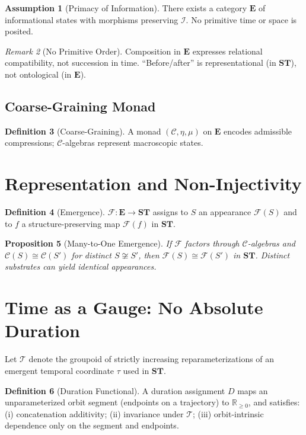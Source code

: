 \documentclass[11pt]{article}
\theoremstyle{definition}
\newtheorem{definition}{Definition}[section]
\newtheorem{assumption}[definition]{Assumption}
\theoremstyle{plain}
\newtheorem{proposition}[definition]{Proposition}
\theoremstyle{remark}
\newtheorem{remark}[definition]{Remark}
\newcommand{\Ecat}{\mathbf{E}}      %
\newcommand{\ST}{\mathbf{ST}}       %
\newcommand{\F}{\mathcal{F}}        %
\newcommand{\I}{\mathcal{I}}        %
\newcommand{\C}{\mathcal{C}}        %
\begin{document}
\begin{assumption}[Primacy of Information]
There exists a category $\Ecat$ of informational states with morphisms preserving $\I$. No primitive time or space is posited.
\end{assumption}

\begin{remark}[No Primitive Order]
Composition in $\Ecat$ expresses relational compatibility, not succession in time. ``Before/after'' is representational (in $\ST$), not ontological (in $\Ecat$).
\end{remark}

\subsection{Coarse-Graining Monad}
\begin{definition}[Coarse-Graining]
A monad $(\C,\eta,\mu)$ on $\Ecat$ encodes admissible compressions; $\C$-algebras represent macroscopic states.
\end{definition}

\section{Representation and Non-Injectivity}
\begin{definition}[Emergence]
$\F:\Ecat\to\ST$ assigns to $S$ an appearance $\F(S)$ and to $f$ a structure-preserving map $\F(f)$ in $\ST$.
\end{definition}

\begin{proposition}[Many-to-One Emergence]
If $\F$ factors through $\C$-algebras and $\C(S)\cong\C(S')$ for distinct $S\not\cong S'$, then $\F(S)\cong \F(S')$ in $\ST$. Distinct substrates can yield identical appearances.
\end{proposition}

\section{Time as a Gauge: No Absolute Duration}
Let $\mathcal{T}$ denote the groupoid of strictly increasing reparameterizations of an emergent temporal coordinate $\tau$ used in $\ST$.

\begin{definition}[Duration Functional]
A duration assignment $D$ maps an unparameterized orbit segment (endpoints on a trajectory) to $\mathbb{R}_{\ge 0}$, and satisfies: (i) concatenation additivity; (ii) invariance under $\mathcal{T}$; (iii) orbit-intrinsic dependence only on the segment and endpoints.
\end{definition}
\end{document}
